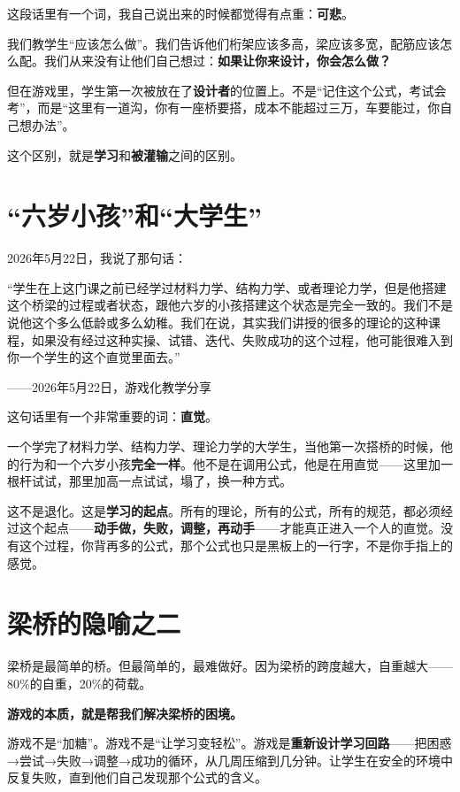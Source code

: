 这段话里有一个词，我自己说出来的时候都觉得有点重：\textbf{可悲}。

我们教学生``应该怎么做''。我们告诉他们桁架应该多高，梁应该多宽，配筋应该怎么配。我们从来没有让他们自己想过：\textbf{如果让你来设计，你会怎么做？}

但在游戏里，学生第一次被放在了\textbf{设计者}的位置上。不是``记住这个公式，考试会考''，而是``这里有一道沟，你有一座桥要搭，成本不能超过三万，车要能过，你自己想办法''。

这个区别，就是\textbf{学习}和\textbf{被灌输}之间的区别。

\section{``六岁小孩''和``大学生''}

2026年5月22日，我说了那句话：

\begin{shiyu-inline}
``学生在上这门课之前已经学过材料力学、结构力学、或者理论力学，但是他搭建这个桥梁的过程或者状态，跟他六岁的小孩搭建这个状态是完全一致的。我们不是说他这个多么低龄或多么幼稚。我们在说，其实我们讲授的很多的理论的这种课程，如果没有经过这种实操、试错、迭代、失败成功的这个过程，他可能很难入到你一个学生的这个直觉里面去。''

\hfill ——2026年5月22日，游戏化教学分享
\end{shiyu-inline}

这句话里有一个非常重要的词：\textbf{直觉}。

一个学完了材料力学、结构力学、理论力学的大学生，当他第一次搭桥的时候，他的行为和一个六岁小孩\textbf{完全一样}。他不是在调用公式，他是在用直觉——这里加一根杆试试，那里加高一点试试，塌了，换一种方式。

这不是退化。这是\textbf{学习的起点}。所有的理论，所有的公式，所有的规范，都必须经过这个起点——\textbf{动手做，失败，调整，再动手}——才能真正进入一个人的直觉。没有这个过程，你背再多的公式，那个公式也只是黑板上的一行字，不是你手指上的感觉。

\section{梁桥的隐喻之二}

梁桥是最简单的桥。但最简单的，最难做好。因为梁桥的跨度越大，自重越大——80\%的自重，20\%的荷载。

\textbf{游戏的本质，就是帮我们解决梁桥的困境。}

游戏不是``加糖''。游戏不是``让学习变轻松''。游戏是\textbf{重新设计学习回路}——把困惑→尝试→失败→调整→成功的循环，从几周压缩到几分钟。让学生在安全的环境中反复失败，直到他们自己发现那个公式的含义。

